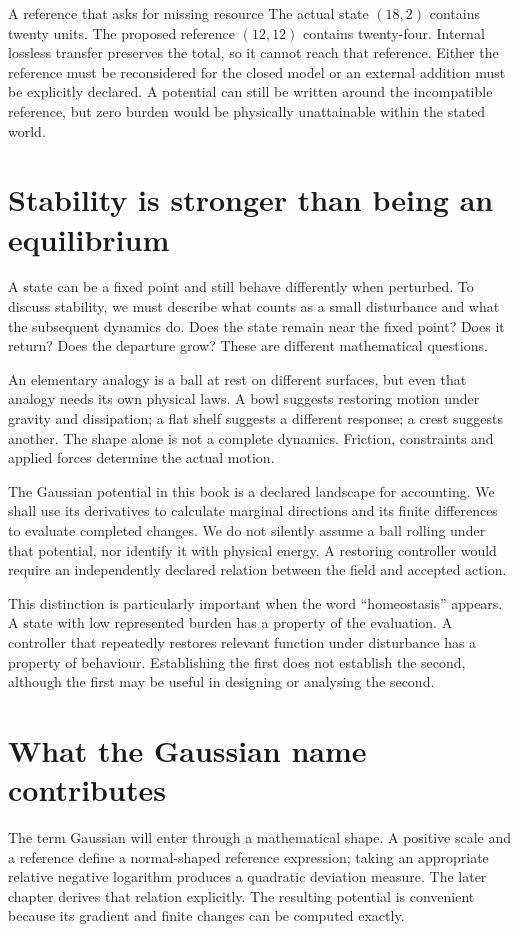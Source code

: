 \begin{workedbox}{A reference that asks for missing resource}
The actual state $(18,2)$ contains twenty units. The proposed reference $(12,12)$ contains twenty-four. Internal lossless transfer preserves the total, so it cannot reach that reference. Either the reference must be reconsidered for the closed model or an external addition must be explicitly declared. A potential can still be written around the incompatible reference, but zero burden would be physically unattainable within the stated world.
\end{workedbox}

\section{Stability is stronger than being an equilibrium}
A state can be a fixed point and still behave differently when perturbed. To discuss stability, we must describe what counts as a small disturbance and what the subsequent dynamics do. Does the state remain near the fixed point? Does it return? Does the departure grow? These are different mathematical questions.

An elementary analogy is a ball at rest on different surfaces, but even that analogy needs its own physical laws. A bowl suggests restoring motion under gravity and dissipation; a flat shelf suggests a different response; a crest suggests another. The shape alone is not a complete dynamics. Friction, constraints and applied forces determine the actual motion.

The Gaussian potential in this book is a declared landscape for accounting. We shall use its derivatives to calculate marginal directions and its finite differences to evaluate completed changes. We do not silently assume a ball rolling under that potential, nor identify it with physical energy. A restoring controller would require an independently declared relation between the field and accepted action.

This distinction is particularly important when the word ``homeostasis'' appears. A state with low represented burden has a property of the evaluation. A controller that repeatedly restores relevant function under disturbance has a property of behaviour. Establishing the first does not establish the second, although the first may be useful in designing or analysing the second.

\section{What the Gaussian name contributes}
The term Gaussian will enter through a mathematical shape. A positive scale and a reference define a normal-shaped reference expression; taking an appropriate relative negative logarithm produces a quadratic deviation measure. The later chapter derives that relation explicitly. The resulting potential is convenient because its gradient and finite changes can be computed exactly.

